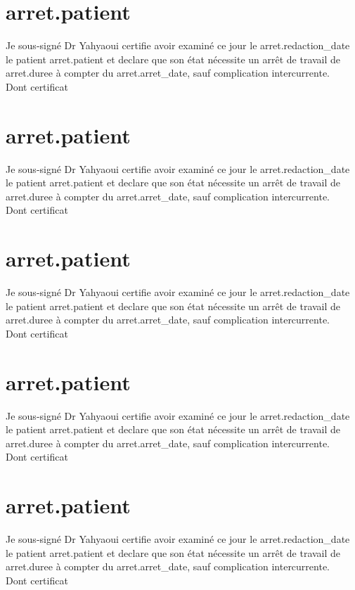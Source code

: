 \documentclass[12pt,a4paper]{article}
\begin{document}
                  \section{ {{arret.patient}} }
         Je sous-signé Dr Yahyaoui certifie avoir examiné ce jour le {{arret.redaction_date}} le patient {{arret.patient}} et declare que son
         état nécessite un arrêt de travail de {{arret.duree}} à compter du {{arret.arret_date}}, sauf complication intercurrente. \\
         Dont certificat
                  
                  \section{ {{arret.patient}} }
         Je sous-signé Dr Yahyaoui certifie avoir examiné ce jour le {{arret.redaction_date}} le patient {{arret.patient}} et declare que son
         état nécessite un arrêt de travail de {{arret.duree}} à compter du {{arret.arret_date}}, sauf complication intercurrente. \\
         Dont certificat
                  
                  \section{ {{arret.patient}} }
         Je sous-signé Dr Yahyaoui certifie avoir examiné ce jour le {{arret.redaction_date}} le patient {{arret.patient}} et declare que son
         état nécessite un arrêt de travail de {{arret.duree}} à compter du {{arret.arret_date}}, sauf complication intercurrente. \\
         Dont certificat
                  
                  \section{ {{arret.patient}} }
         Je sous-signé Dr Yahyaoui certifie avoir examiné ce jour le {{arret.redaction_date}} le patient {{arret.patient}} et declare que son
         état nécessite un arrêt de travail de {{arret.duree}} à compter du {{arret.arret_date}}, sauf complication intercurrente. \\
         Dont certificat
                  
                  \section{ {{arret.patient}} }
         Je sous-signé Dr Yahyaoui certifie avoir examiné ce jour le {{arret.redaction_date}} le patient {{arret.patient}} et declare que son
         état nécessite un arrêt de travail de {{arret.duree}} à compter du {{arret.arret_date}}, sauf complication intercurrente. \\
         Dont certificat
                  
\end{document}
